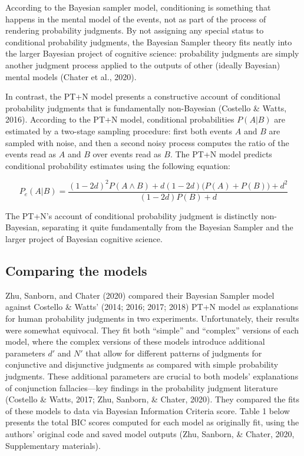 \documentclass[
  english,
  man,floatsintext]{apa6}
\begin{document}
According to the Bayesian sampler model, conditioning is something that happens in the mental model of the events, not as part of the process of rendering probability judgments. By not assigning any special status to conditional probability judgments, the Bayesian Sampler theory fits neatly into the larger Bayesian project of cognitive science: probability judgments are simply another judgment process applied to the outputs of other (ideally Bayesian) mental models (Chater et al., 2020).

In contrast, the PT+N model presents a constructive account of conditional probability judgments that is fundamentally non-Bayesian (Costello \& Watts, 2016). According to the PT+N model, conditional probabilities \(P(A|B)\) are estimated by a two-stage sampling procedure: first both events \(A\) and \(B\) are sampled with noise, and then a second noisy process computes the ratio of the events read as \(A\) and \(B\) over events read as \(B\). The PT+N model predicts conditional probability estimates using the following equation:

\[P_e(A|B) = \frac{(1-2d)^2P(A \land B) + d(1-2d)\big(P(A)+P(B)\big)+d^2}{(1-2d)P(B)+d}\]

The PT+N's account of conditional probability judgment is distinctly non-Bayesian, separating it quite fundamentally from the Bayesian Sampler and the larger project of Bayesian cognitive science.

\hypertarget{comparing-the-models}{%
\subsection{Comparing the models}\label{comparing-the-models}}

Zhu, Sanborn, and Chater (2020) compared their Bayesian Sampler model against Costello \& Watts' (2014; 2016; 2017; 2018) PT+N model as explanations for human probability judgments in two experiments. Unfortunately, their results were somewhat equivocal. They fit both ``simple'' and ``complex'' versions of each model, where the complex versions of these models introduce additional parameters \(d'\) and \(N'\) that allow for different patterns of judgments for conjunctive and disjunctive judgments as compared with simple probability judgments. These additional parameters are crucial to both models' explanations of conjunction fallacies---key findings in the probability judgment literature (Costello \& Watts, 2017; Zhu, Sanborn, \& Chater, 2020). They compared the fits of these models to data via Bayesian Information Criteria score. Table 1 below presents the total BIC scores computed for each model as originally fit, using the authors' original code and saved model outputs (Zhu, Sanborn, \& Chater, 2020, Supplementary materials).
\end{document}

